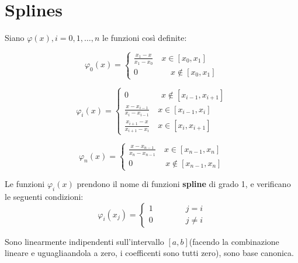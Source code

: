 \section{Splines}
Siano $\varphi(x), i=0,1,\dots, n$ le funzioni così definite:

\begin{equation}
  \varphi_0(x) = \begin{cases}
    \displaystyle\frac{x_1-x}{x_1-x_0} \quad x \in [x_0, x_1] \\  
    0 \quad\quad\quad\quad x \notin [x_0, x_1]
  \end{cases}
\end{equation}



\begin{equation}
  \varphi_i(x) = \begin{cases}
  0 \quad\quad\quad\quad x \notin [x_{i-1}, x_{i+1}] \\

  
    \displaystyle\frac{x-x_{i-1}}{x_i-x_{i-1}} \quad x \in [x_{i-1}, x_i] \\  

    \displaystyle\frac{x_{i+1}-x}{x_{i+1}-x_{i}} \quad x \in [x_{i}, x_{i + 1}]


  \end{cases}
\end{equation}

\begin{equation}
  \varphi_n(x) = \begin{cases}

    \displaystyle\frac{x-x_{n-1}}{x_n-x_{n-1}} \quad x \in [x_{n-1}, x_n] \\  
  0 \quad\quad\quad\quad x \notin [x_{n-1}, x_{n}]
  \end{cases}
\end{equation}


Le funzioni $\varphi_i(x)$ prendono il nome di funzioni \textbf{spline} di grado 1, e verificano le seguenti condizioni:
\begin{equation}
  \varphi_i(x_j) = \begin{cases}
  1 \quad\quad\quad\quad j=i \\
  0 \quad\quad\quad\quad j\neq i
  \end{cases}
\end{equation}

Sono linearmente indipendenti sull'intervallo $[a, b]$(facendo la combinazione lineare e uguagliaandola a zero, i coefficenti sono tutti zero), sono base canonica.


